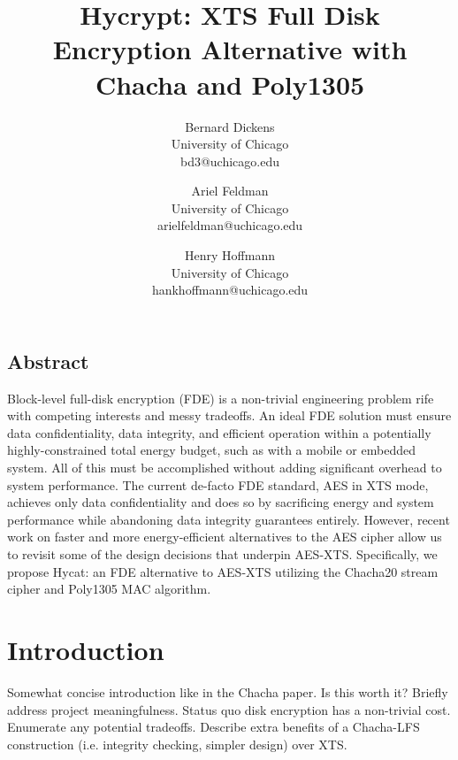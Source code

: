 \documentclass[letterpaper,twocolumn,10pt]{article}
\begin{document}
\date{}

\title{\Large \bf Hycrypt: XTS Full Disk Encryption Alternative with Chacha and Poly1305}

\author{
{\rm Bernard Dickens}\\
University of Chicago\\
bd3@uchicago.edu
\and
{\rm Ariel Feldman}\\
University of Chicago\\
arielfeldman@uchicago.edu
\and
{\rm Henry Hoffmann}\\
University of Chicago\\
hankhoffmann@uchicago.edu
} %

\maketitle

\thispagestyle{empty}

\subsection*{Abstract}
Block-level full-disk encryption (FDE) is a non-trivial engineering problem rife with competing interests and
messy tradeoffs. An ideal FDE solution must ensure data confidentiality, data integrity, and efficient operation
within a potentially highly-constrained total energy budget, such as with a mobile or embedded system. All of this must
be accomplished without adding significant overhead to system performance. The current de-facto FDE standard,
AES in XTS mode, achieves only data confidentiality and does so by sacrificing energy and system performance while
abandoning data integrity guarantees entirely. However, recent work on faster and more energy-efficient alternatives to
the AES cipher allow us to revisit some of the design decisions that underpin AES-XTS. Specifically, we propose Hycat: an
FDE alternative to AES-XTS utilizing the Chacha20 stream cipher and Poly1305 MAC algorithm.

\section{Introduction}
Somewhat concise introduction like in the Chacha paper. Is this worth it? Briefly address project meaningfulness.
Status quo disk encryption has a non-trivial cost. Enumerate any potential tradeoffs. Describe extra benefits of a
Chacha-LFS construction (i.e. integrity checking, simpler design) over XTS.
\end{document}
